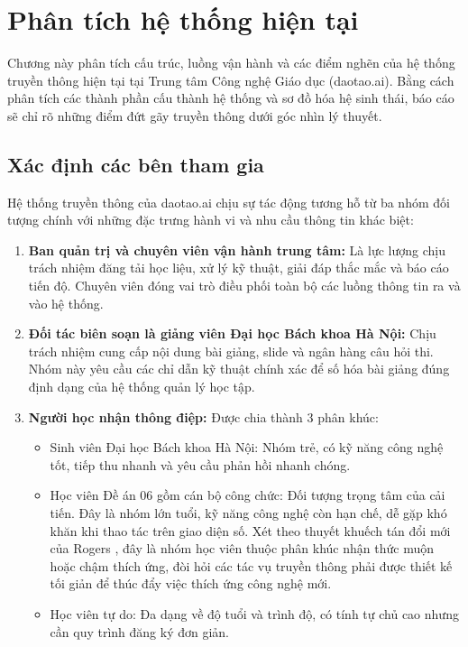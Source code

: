\section{Phân tích hệ thống hiện tại}

Chương này phân tích cấu trúc, luồng vận hành và các điểm nghẽn của hệ thống truyền thông hiện tại tại Trung tâm Công nghệ Giáo dục (daotao.ai). Bằng cách phân tích các thành phần cấu thành hệ thống và sơ đồ hóa hệ sinh thái, báo cáo sẽ chỉ rõ những điểm đứt gãy truyền thông dưới góc nhìn lý thuyết.

\subsection{Xác định các bên tham gia}

Hệ thống truyền thông của daotao.ai chịu sự tác động tương hỗ từ ba nhóm đối tượng chính với những đặc trưng hành vi và nhu cầu thông tin khác biệt:
\begin{enumerate}
    \item \textbf{Ban quản trị và chuyên viên vận hành trung tâm:} Là lực lượng chịu trách nhiệm đăng tải học liệu, xử lý kỹ thuật, giải đáp thắc mắc và báo cáo tiến độ. Chuyên viên đóng vai trò điều phối toàn bộ các luồng thông tin ra và vào hệ thống.
    \item \textbf{Đối tác biên soạn là giảng viên Đại học Bách khoa Hà Nội:} Chịu trách nhiệm cung cấp nội dung bài giảng, slide và ngân hàng câu hỏi thi. Nhóm này yêu cầu các chỉ dẫn kỹ thuật chính xác để số hóa bài giảng đúng định dạng của hệ thống quản lý học tập.
    \item \textbf{Người học nhận thông điệp:} Được chia thành 3 phân khúc:
    \begin{itemize}
        \item Sinh viên Đại học Bách khoa Hà Nội: Nhóm trẻ, có kỹ năng công nghệ tốt, tiếp thu nhanh và yêu cầu phản hồi nhanh chóng.
        \item Học viên Đề án 06 gồm cán bộ công chức: Đối tượng trọng tâm của cải tiến. Đây là nhóm lớn tuổi, kỹ năng công nghệ còn hạn chế, dễ gặp khó khăn khi thao tác trên giao diện số. Xét theo thuyết khuếch tán đổi mới của Rogers \parencite{rogers2003}, đây là nhóm học viên thuộc phân khúc nhận thức muộn hoặc chậm thích ứng, đòi hỏi các tác vụ truyền thông phải được thiết kế tối giản để thúc đẩy việc thích ứng công nghệ mới.
        \item Học viên tự do: Đa dạng về độ tuổi và trình độ, có tính tự chủ cao nhưng cần quy trình đăng ký đơn giản.
    \end{itemize}
\end{enumerate}

